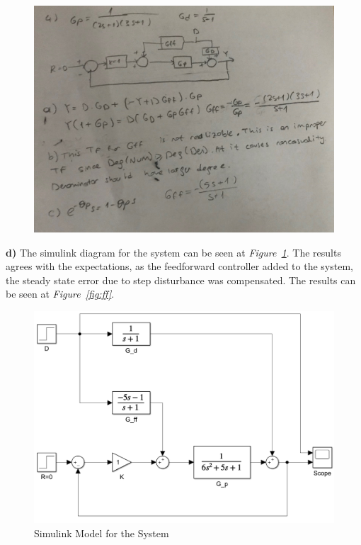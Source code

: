 \documentclass[a4paper,12pt]{article}
\begin{document}
\begin{enumerate}
				\begin{figure}[H]
					\center
					\setlength{\unitlength}{\textwidth} 
					\includegraphics[width=1.0\unitlength]{images/4abc}
				\end{figure}
				
			\textbf{d)} The simulink diagram for the system can be seen at \textit{Figure~\ref{fig:simu}}. The results agrees with the expectations, as the feedforward controller added to the system, the steady state error due to step disturbance was compensated. The results can be seen at \textit{Figure~\ref{fig:ff}}.
			
				\begin{figure}[H]
					\center
					\setlength{\unitlength}{\textwidth} 
					\includegraphics[width=0.6\unitlength]{images/q4}
					\caption{\label{fig:simu} Simulink Model for the System   }
				\end{figure}
				

\end{enumerate}
\end{document}
